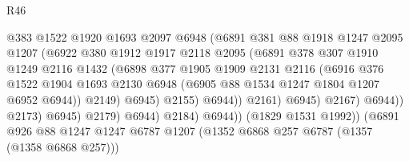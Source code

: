 \begin{lexlean}{R46}
\begin{coremodule}
                                    @383
                                    @1522
                                    @1920
                                    @1693
                                    @2097
                                    @6948
                                    (@6891
                                      @381
                                      @88
                                      @1918
                                      @1247
                                      @2095
                                      @1207
                                      (@6922
                                        @380
                                        @1912
                                        @1917
                                        @2118
                                        @2095
                                        (@6891
                                          @378
                                          @307
                                          @1910
                                          @1249
                                          @2116
                                          @1432
                                          (@6898
                                            @377
                                            @1905
                                            @1909
                                            @2131
                                            @2116
                                            (@6916
                                              @376
                                              @1522
                                              @1904
                                              @1693
                                              @2130
                                              @6948
                                              (@6905 @88 @1534 @1247 @1804 @1207 @6952 @6944))
                                            @2149)
                                          @6945)
                                        @2155)
                                      @6944))
                                  @2161)
                                @6945)
                              @2167)
                            @6944))
                        @2173)
                      @6945)
                    @2179)
                  @6944)
                @2184)
              @6944))
          (@1829 @1531 @1992))
        (@6891
          @926
          @88
          @1247
          @1247
          @6787
          @1207
          (@1352 @6868 @257 @6787 (@1357 (@1358 @6868 @257)))

\end{coremodule}
\end{lexlean}
